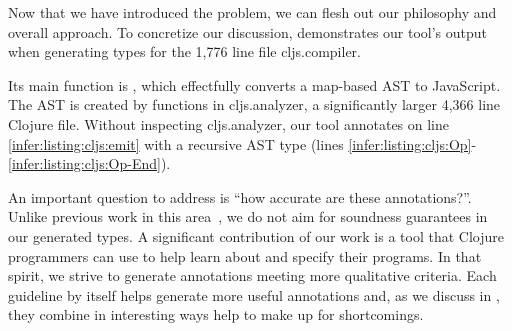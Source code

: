 Now that we have introduced the problem,
we can flesh out our philosophy and overall
approach. To concretize our discussion,
 demonstrates our tool's output
when generating types for the 1,776 line file cljs.compiler.

Its main function is , which
effectfully converts a map-based AST
to JavaScript.
The AST is created by functions in cljs.analyzer,
a significantly larger 4,366 line Clojure file.
Without inspecting cljs.analyzer,
our tool annotates  on line \ref{infer:listing:cljs:emit}
with a recursive AST type  (lines \ref{infer:listing:cljs:Op}-\ref{infer:listing:cljs:Op-End}).

%




An important question to address is ``how accurate are these annotations?''.
Unlike previous work in this area~, we do not aim for soundness guarantees
in our generated types. 
A significant contribution of our work is a tool that Clojure programmers
can use to help learn about and specify their programs.
In that spirit, we strive to generate annotations meeting more qualitative criteria.
Each guideline by itself helps generate more useful annotations and,
as we discuss in ,
they combine in interesting ways help to make up for shortcomings.

